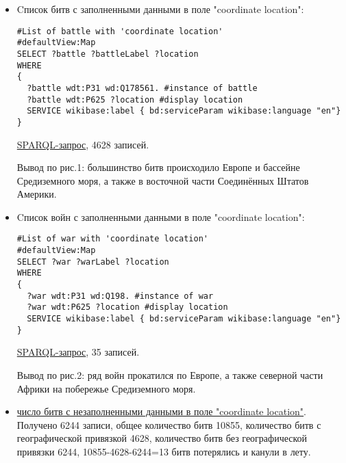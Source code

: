 \begin{itemize}
\item{Cписок битв с заполненными данными в поле "coordinate location":}
\begin{lstlisting}[language=SPARQL ]
#List of battle with 'coordinate location' 
#defaultView:Map
SELECT ?battle ?battleLabel ?location
WHERE
{
  ?battle wdt:P31 wd:Q178561. #instance of battle
  ?battle wdt:P625 ?location #display location
  SERVICE wikibase:label { bd:serviceParam wikibase:language "en"}
}
\end{lstlisting}

\href{https://query.wikidata.org/#%23List%20of%20battle%20with%20%27coordinate%20location%27%20%0A%23defaultView%3AMap%0ASELECT%20%3Fbattle%20%3FbattleLabel%20%3Flocation%0AWHERE%0A%7B%0A%20%20%3Fbattle%20wdt%3AP31%20wd%3AQ178561.%20%23instance%20of%20battle%0A%20%20%3Fbattle%20wdt%3AP625%20%3Flocation%20%23display%20location%0A%20%20SERVICE%20wikibase%3Alabel%20%7B%20bd%3AserviceParam%20wikibase%3Alanguage%20%22en%22%7D%0A%7D}{SPARQL-запрос}, 4628 записей.

Вывод по рис.1: большинство битв происходило Европе и бассейне Средиземного моря, а также в восточной части Соединённых Штатов Америки.

\item{Cписок войн с заполненными данными в поле "coordinate location":} 


\begin{lstlisting}[language=SPARQL]
#List of war with 'coordinate location' 
#defaultView:Map
SELECT ?war ?warLabel ?location
WHERE
{
  ?war wdt:P31 wd:Q198. #instance of war
  ?war wdt:P625 ?location #display location
  SERVICE wikibase:label { bd:serviceParam wikibase:language "en"}
}
\end{lstlisting}


\href{https://query.wikidata.org/#%23List%20of%20war%20with%20%27coordinate%20location%27%20%0A%23defaultView%3AMap%0ASELECT%20%3Fwar%20%3FwarLabel%20%3Flocation%0AWHERE%0A%7B%0A%20%20%3Fwar%20wdt%3AP31%20wd%3AQ198.%20%23instance%20of%20war%0A%20%20%3Fwar%20wdt%3AP625%20%3Flocation%20%23display%20location%0A%20%20SERVICE%20wikibase%3Alabel%20%7B%20bd%3AserviceParam%20wikibase%3Alanguage%20%22en%22%7D%0A%7D}{SPARQL-запрос}, 35 записей.

Вывод по рис.2: ряд войн прокатился по Европе, а также северной части Африки на побережье Средиземного моря.

\item{}
\href{https://query.wikidata.org/#%23List%20of%20battle%20with%20unfilled%20property%20%27location%27%20%0ASELECT%20%3Fbattle%20%3FbattleLabel%20%3Flocation%0AWHERE%0A%7B%0A%20%20%3Fbattle%20wdt%3AP31%20wd%3AQ178561.%20%23instance%20of%20battle%0A%20%20FILTER%20NOT%20EXISTS%20%7B%20%3Fbattle%20wdt%3AP625%20%5B%5D%20%7D%20%23if%20property%20location%20is%20unfilled%0A%20%20SERVICE%20wikibase%3Alabel%20%7B%20bd%3AserviceParam%20wikibase%3Alanguage%20%22en%22%7D%0A%7D}{число битв с незаполненными данными в поле "coordinate location"}. Получено 6244 записи, общее количество битв 10855, количество битв с географической привязкой 4628, количество битв без географической привязки 6244, 10855-4628-6244=13 битв потерялись и канули в лету.


\end{itemize}
